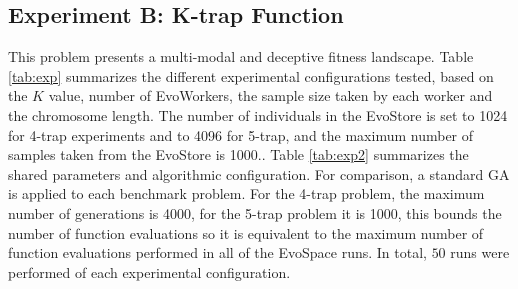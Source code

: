 \subsection{Experiment B: K-trap Function}
This problem presents a multi-modal and deceptive fitness landscape.
Table \ref{tab:exp} summarizes the different experimental configurations tested, based on the $K$ value, number of EvoWorkers, the sample size taken by each worker and the chromosome length.
The number of individuals in the EvoStore is set to 1024 for 4-trap experiments and to 4096 for 5-trap,
and the maximum number of samples taken from the EvoStore is 1000..
Table \ref{tab:exp2} summarizes the shared parameters and algorithmic configuration.
For comparison, a standard GA is applied to each benchmark problem.
For the 4-trap problem, the maximum number of generations is 4000, for the 5-trap problem it is 1000,
this bounds the number of function evaluations so it is equivalent to the maximum number of function evaluations performed in all of
the EvoSpace runs. In total, $50$ runs were performed of each experimental configuration.


